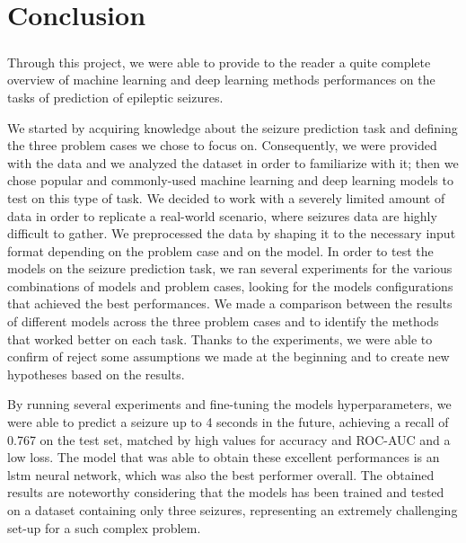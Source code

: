 
\chapter{Conclusion} \label{chap: conclusion}

\paragraph{} Through this project, we were able to provide to the reader a quite complete overview of machine learning and deep learning methods performances on the tasks of prediction of epileptic seizures.

We started by acquiring knowledge about the seizure prediction task and defining the three problem cases we chose to focus on. Consequently, we were provided with the data and we analyzed the dataset in order to familiarize with it; then we chose popular and commonly-used machine learning and deep learning models to test on this type of task. We decided to work with a severely limited amount of data in order to replicate a real-world scenario, where seizures data are highly difficult to gather. We preprocessed the data by shaping it to the necessary input format depending on the problem case and on the model. In order to test the models on the seizure prediction task, we ran several experiments for the various combinations of models and problem cases, looking for the models configurations that achieved the best performances. We made a comparison between the results of different models across the three problem cases and to identify the methods that worked better on each task. Thanks to the experiments, we were able to confirm of reject some assumptions we made at the beginning and to create new hypotheses based on the results.

By running several experiments and fine-tuning the models hyperparameters, we were able to predict a seizure up to 4 seconds in the future, achieving a recall of 0.767 on the test set, matched by high values for accuracy and ROC-AUC and a low loss. The model that was able to obtain these excellent performances is an \acs{lstm} neural network, which was also the best performer overall. The obtained results are noteworthy considering that the models has been trained and tested on a dataset containing only three seizures, representing an extremely challenging set-up for a such complex problem.

